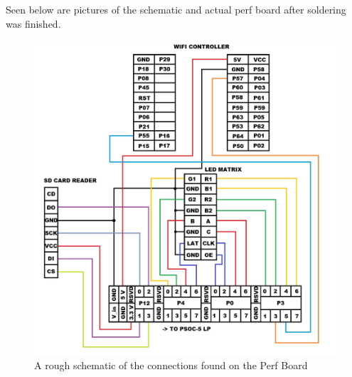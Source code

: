 \documentclass[a4paper, 12pt]{article}
\begin{document}
    \clearpage
    Seen below are pictures of the schematic and actual perf board after
    soldering was finished.

    \begin{figure}[H]
        \centering
        \includegraphics[scale=0.3]{pics/perf}
        \caption{A rough schematic of the connections found on the Perf Board}
        \label{fig:SolderSetup}
    \end{figure}
\end{document}
